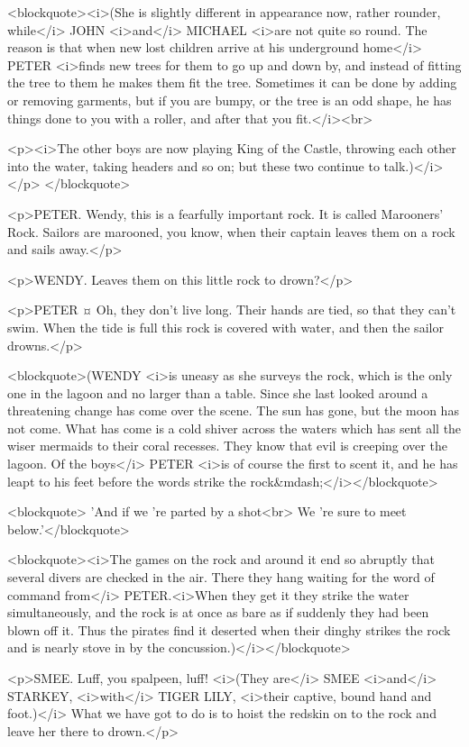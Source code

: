 <blockquote><i>(She is slightly different in appearance now, rather rounder, while</i> JOHN <i>and</i> MICHAEL <i>are not quite so round. The reason is that when new lost children arrive at his underground home</i> PETER <i>finds new trees for them to go up and down by, and instead of fitting the tree to them he makes them fit the tree. Sometimes it can be done by adding or removing garments, but if you are bumpy, or the tree is an odd shape, he has things done to you with a roller, and after that you fit.</i><br> 

<p><i>The other boys are now playing King of the Castle, throwing each other into the water, taking headers and so on; but these two continue to talk.)</i></p> </blockquote>

<p>PETER. Wendy, this is a fearfully important rock. It is called Marooners' Rock. Sailors are marooned, you know, when their captain leaves them on a rock and sails away.</p>

<p>WENDY. Leaves them on this little rock to drown?</p>

<p>PETER ¤
Oh, they don't live long. Their hands are tied, so that they can't swim. When the tide is full this rock is covered with water, and then the sailor drowns.</p>

<blockquote>(WENDY <i>is uneasy as she surveys the rock, which is the only one in the lagoon and no larger than a table. Since she last looked around a threatening change has come over the scene. The sun has gone, but the moon has not come. What has come is a cold shiver across the waters which has sent all the wiser mermaids to their coral recesses. They know that evil is creeping over the lagoon. Of the boys</i> PETER <i>is of course the first to scent it, and he has leapt to his feet before the words strike the rock&mdash;</i></blockquote>

<blockquote> 'And if we 're parted by a shot<br> We 're sure to meet below.'</blockquote>

<blockquote><i>The games on the rock and around it end so abruptly that several divers are checked in the air. There they hang waiting for the word of command from</i> PETER.<i>When they get it they strike the water simultaneously, and the rock is at once as bare as if suddenly they had been blown off it. Thus the pirates find it deserted when their dinghy strikes the rock and is nearly stove in by the concussion.)</i></blockquote>

<p>SMEE. Luff, you spalpeen, luff! <i>(They are</i> SMEE <i>and</i> STARKEY, <i>with</i> TIGER LILY, <i>their captive, bound hand and foot.)</i> What we have got to do is to hoist the redskin on to the rock and leave her there to drown.</p>

